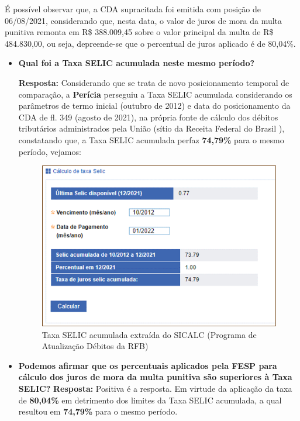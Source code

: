 \begin{addmargin}[6cm]{} %

É possível observar que, a CDA supracitada foi emitida com posição de 06/08/2021, considerando que, nesta data, o valor de juros de mora da multa punitiva remonta em R\$ 388.009,45 sobre o valor principal da multa de R\$ 484.830,00, ou seja, depreende-se que o percentual de juros aplicado é de 80,04\%.
    \begin{itemize}
        \item \textbf{Qual foi a Taxa SELIC acumulada neste mesmo período?}

    \textbf{Resposta:} Considerando que se trata de novo posicionamento temporal de comparação, a \textbf{Perícia} perseguiu a Taxa SELIC acumulada considerando os parâmetros de termo inicial (outubro de 2012) e data do posicionamento da CDA de fl. 349 (agosto de 2021), na própria fonte de cálculo dos débitos tributários administrados pela União (sítio da Receita Federal do Brasil ), constatando que, a Taxa SELIC acumulada perfaz \textbf{74,79\%} para o mesmo período, vejamos:

\begin{figure}[!h]
    \includegraphics{Imagens/Taxa SELIC acumulada extraída do SICALC (Programa de Atualização Débitos da RFB).png}
    \caption{Taxa SELIC acumulada extraída do SICALC (Programa de Atualização Débitos da RFB)}
    \label{fig:my_label}
\end{figure}

 \item \textbf{Podemos afirmar que os percentuais aplicados pela FESP para cálculo dos juros de mora da multa punitiva são superiores à Taxa SELIC?}
\textbf{Resposta:} Positiva é a resposta. Em virtude da aplicação da taxa de \textbf{80,04\%} em detrimento dos limites da Taxa SELIC acumulada, a qual resultou em \textbf{74,79\%} para o mesmo período.


\end{itemize}
\end{addmargin}
